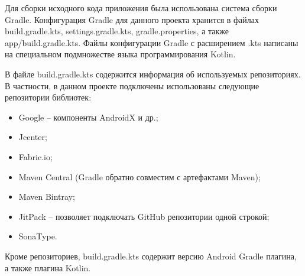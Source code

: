 Для сборки исходного кода приложения была использована система сборки Gradle.
Конфигурация Gradle для данного проекта хранится в файлах build.gradle.kts, settings.gradle.kts, gradle.properties, а также app/build.gradle.kts. Файлы конфигурации Gradle с расширением .kts написаны на специальном подмножестве языка программирования Kotlin.

В файле build.gradle.kts содержится информация об используемых репозиториях. В частности, в данном проекте подключены использованы следующие репозитории библиотек:
\begin{itemize}
	\item Google -- компоненты AndroidX и др.;
	\item Jcenter;
	\item Fabric.io;
	\item Maven Central (Gradle обратно совместим с артефактами Maven);
	\item Maven Bintray;
	\item JitPack -- позволяет подключать GitHub репозитории одной строкой;
	\item SonaType.
\end{itemize}

Кроме репозиториев, build.gradle.kts содержит версию Android Gradle плагина, а также плагина Kotlin.

